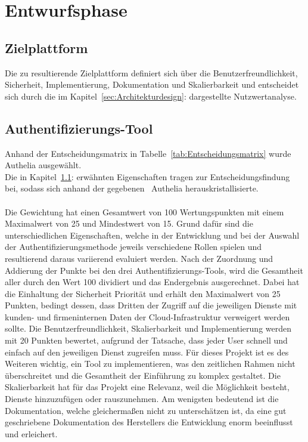 \section{Entwurfsphase} 
\label{sec:Entwurfsphase}

\subsection{Zielplattform}
\label{sec:Zielplattform}
Die zu resultierende Zielplattform definiert sich über die Benutzerfreundlichkeit, Sicherheit, Implementierung, 
Dokumentation und Skalierbarkeit und entscheidet sich durch die im Kapitel~\ref{sec:Architekturdesign}:  
dargestellte Nutzwertanalyse.


\subsection{Authentifizierungs-Tool}
\label{sec:Authentifizierungs-Tool}
Anhand der Entscheidungsmatrix in Tabelle~\ref{tab:Entscheidungsmatrix} wurde Authelia ausgewählt. 
\\Die in Kapitel~\ref{sec:Zielplattform}:  erwähnten Eigenschaften tragen zur Entscheidungsfindung bei, sodass 
sich anhand der gegebenen~ Authelia herauskristallisierte.
\\
\\Die Gewichtung hat einen Gesamtwert von 100 Wertungspunkten mit einem Maximalwert von 25 und Mindestwert von 15. Grund dafür sind die 
unterschiedlichen Eigenschaften, welche in der Entwicklung und bei der Auswahl der Authentifizierungsmethode jeweils verschiedene Rollen 
spielen und resultierend daraus variierend evaluiert werden. Nach der Zuordnung und Addierung der Punkte bei den drei Authentifizierungs-Tools, 
wird die Gesamtheit aller durch den Wert 100 dividiert und das Endergebnis ausgerechnet. Dabei hat die Einhaltung der Sicherheit Priorität und 
erhält den Maximalwert von 25 Punkten, bedingt dessen, dass Dritten der Zugriff auf die jeweiligen Dienste mit kunden- und firmeninternen Daten 
der Cloud-Infrastruktur verweigert werden sollte. 
Die Benutzerfreundlichkeit, Skalierbarkeit und Implementierung werden mit 20 Punkten bewertet, aufgrund der Tatsache, dass jeder User schnell und 
einfach auf den jeweiligen Dienst zugreifen muss. Für dieses Projekt ist es des Weiteren wichtig, ein Tool zu implementieren, was den 
zeitlichen Rahmen nicht überschreitet und die Gesamtheit der Einführung zu komplex gestaltet. Die Skalierbarkeit hat für das Projekt eine 
Relevanz, weil die Möglichkeit besteht, Dienste hinzuzufügen oder rauszunehmen. Am wenigsten bedeutend ist die Dokumentation, welche 
gleichermaßen nicht zu unterschätzen ist, da eine gut geschriebene Dokumentation des Herstellers die Entwicklung enorm beeinflusst und erleichert.


